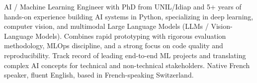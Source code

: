 


\begin{cvparagraph}
AI / Machine Learning Engineer with PhD from UNIL/Idiap and 5+ years of hands-on experience building AI systems in Python, specializing in deep learning, computer vision, and multimodal Large Language Models (LLMs / Vision-Language Models). Combines rapid prototyping with rigorous evaluation methodology, MLOps discipline, and a strong focus on code quality and reproducibility. Track record of leading end-to-end ML projects and translating complex AI concepts for technical and non-technical stakeholders. Native French speaker, fluent English, based in French-speaking Switzerland.

\end{cvparagraph}
